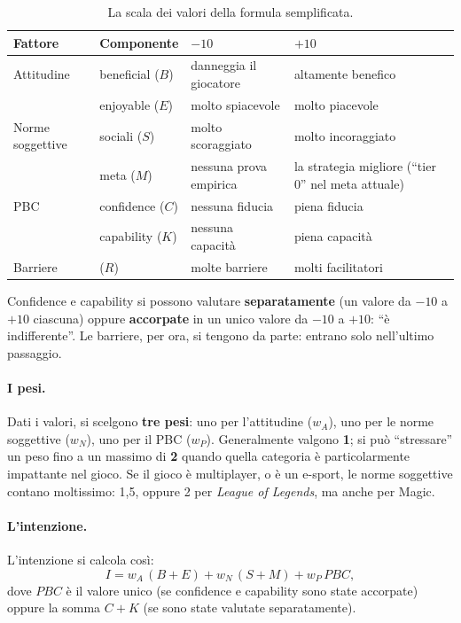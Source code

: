 \begin{table}[htbp]
  \centering
  \caption{La scala dei valori della formula semplificata.}
  \label{gd9:tab:tpb-valori}
  \small
  \begin{tabular}{@{}llp{}p{}@{}}
    \toprule
    \textbf{Fattore} & \textbf{Componente} & \textbf{$-10$} & \textbf{$+10$} \\
    \midrule
    Attitudine & beneficial ($B$) & danneggia il giocatore &
      altamente benefico \\
               & enjoyable ($E$) & molto spiacevole &
      molto piacevole \\
    \addlinespace
    Norme soggettive & sociali ($S$) & molto scoraggiato &
      molto incoraggiato \\
                     & meta ($M$) & nessuna prova empirica &
      la strategia migliore (``tier 0'' nel meta attuale) \\
    \addlinespace
    PBC & confidence ($C$) & nessuna fiducia & piena fiducia \\
        & capability ($K$) & nessuna capacità & piena capacità \\
    \addlinespace
    Barriere & ($R$) & molte barriere & molti facilitatori \\
    \bottomrule
  \end{tabular}
\end{table}

Confidence e capability si possono valutare \textbf{separatamente} (un
valore da $-10$ a $+10$ ciascuna) oppure \textbf{accorpate} in un unico
valore da $-10$ a $+10$: ``è indifferente''. Le barriere, per ora, si tengono
da parte: entrano solo nell'ultimo passaggio.

\paragraph{I pesi.} Dati i valori, si scelgono \textbf{tre pesi}: uno per
l'attitudine ($w_A$), uno per le norme soggettive ($w_N$), uno per il PBC
($w_P$). Generalmente valgono \textbf{1}; si può ``stressare'' un peso fino a
un massimo di \textbf{2} quando quella categoria è particolarmente impattante
nel gioco. Se il gioco è multiplayer, o è un e-sport, le norme soggettive
contano moltissimo: 1,5, oppure 2 per \emph{League of Legends}, ma anche per
Magic.

\paragraph{L'intenzione.} L'intenzione si calcola così:
\[
  I = w_A\,(B + E) + w_N\,(S + M) + w_P\,\mathit{PBC},
\]
dove $\mathit{PBC}$ è il valore unico (se confidence e capability sono state
accorpate) oppure la somma $C + K$ (se sono state valutate separatamente).

